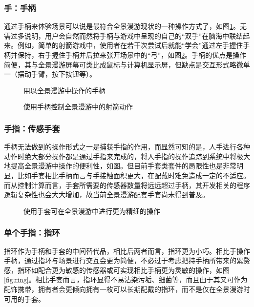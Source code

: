 \subsubsection{手：手柄}
通过手柄来体验场景可以说是最符合全景漫游现状的一种操作方式了，如图\ref{fig:handler}。无需过多说明，用户会自然而然将手柄与游戏中呈现的自己的“双手”在脑海中联结起来。例如，简单的射箭游戏中，使用者在若干次尝试后就能“学会”通过左手握住手柄并保持，右手握住手柄并后拉来张开场景中的“弓”，如图\ref{fig:shoot}。手柄的优点是操作简便，其与全景漫游屏幕可类比成鼠标与计算机显示屏，但缺点是交互形式略微单一（摆动手臂，按下按钮等）。

\begin{figure}[htp]
\centering
{}
\caption{用以全景漫游中操作的手柄}
\label{fig:handler}
\end{figure}

\begin{figure}[htp]
\centering
{}
\caption{使用手柄控制全景漫游中的射箭动作}
\label{fig:shoot}
\end{figure}

\subsubsection{手指：传感手套}
手柄无法做到的操作形式之一是捕获手指的作用，而显然可知的是，人手进行各种动作时绝大部分操作都是通过手指来完成的，将人手指的操作追踪到系统中将极大地提高全景漫游中操作的便利性，如图。但目前手套类套件的局限性也是非常明显，比如手套相比手柄而言与手接触面积更大，在配戴时难免造成一定的不适应。而从控制计算而言，手套所需要的传感器数量将远远超过手柄，其开发相关的程序逻辑复杂性也会大大增加，故当前全景漫游配套手套尚未得到普及。

\begin{figure}[htp]
\centering
{}
\caption{使用手套可在全景漫游中进行更为精细的操作}
\label{fig:gloves}
\end{figure}

\subsubsection{单个手指：指环}
指环作为手柄和手套的中间替代品，相比后两者而言，指环更为小巧。相比于操作手柄，通过指环与场景进行交互会更为简便，不必过于考虑把持手柄所带来的累赘感，指环如配合更为敏感的传感器或可实现相比手柄更为灵敏的操作，如图\ref{fig:ring}。相比手套而言，指环显得不易沾染污垢、细菌等，而且由于其又可作为配饰携带，拥有者会更倾向拥有一枚可以长期配戴的指环，而不是仅在全景漫游时可用的手套。


